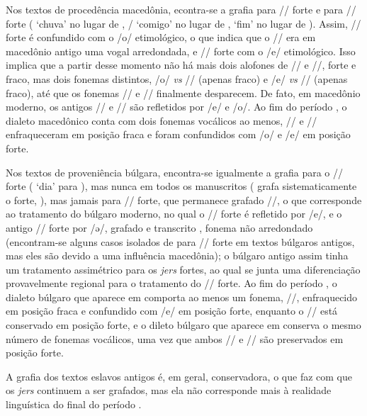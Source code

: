 Nos textos de procedência macedônia, econtra-se a grafia  para
/\jeru{}/ forte e  para /\jeri{}/ forte
( `chuva' no lugar de
, \slash{}
`comigo' no lugar de ,
 `fim' no lugar de
).
Assim, /\jeru{}/ forte é confundido com o /o/ etimológico, o que indica que
o /\jeru{}/ era em macedônio antigo uma vogal arredondada, e /\jeri{}/
forte com o /e/ etimológico.
Isso implica que a partir desse momento não há mais dois alofones de /\jeru{}/
e /\jeri{}/, forte e fraco, mas dois fonemas distintos, /o/ \emph{vs}
/\jeru{}/ (apenas fraco) e /e/ \emph{vs} /\jeri{}/ (apenas fraco), até
que os fonemas /\jeru{}/ e /\jeri{}/ finalmente desparecem.
De fato, em macedônio moderno, os antigos /\jeru{}/ e /\jeri{}/ são
refletidos por /e/ e /o/.
Ao fim do período , o dialeto macedônico conta com dois fonemas
vocálicos ao menos, /\jeru{}/ e /\jeri{}/ enfraqueceram em posição
fraca e foram confundidos com /o/ e /e/ em posição forte.

Nos textos de proveniência  búlgara, encontra-se igualmente  a grafia
 para o /\jeri{}/ forte ( `dia' para
 ), mas nunca em todos os manuscritos
( grafa sistematicamente o  forte,
), mas jamais  para /\jeru{}/ forte, que permanece
grafado /\jeru{}/, o que corresponde ao tratamento do búlgaro moderno, no qual o
/\jeri{}/ forte é refletido por /e/, e o antigo /\jeru{}/ forte por /ə/, grafado
\grafema{\jeru} e transcrito , fonema não arredondado (encontram-se
alguns casos isolados de  para /\jeru{}/ forte em textos búlgaros
antigos, mas eles são devido a uma influência macedônia); o búlgaro antigo assim
tinha um tratamento assimétrico para os \emph{jers} fortes, ao qual se junta uma
diferenciação provavelmente regional para o tratamento do /\jeri{}/ forte.
Ao fim do período , o dialeto búlgaro que aparece em
 comporta ao menos um fonema, /\jeri{}/, enfraquecido em
posição fraca e confundido com /e/ em posição forte, enquanto o /\jeru{}/ está
conservado em posição forte, e o dileto búlgaro que aparece em 
conserva o mesmo número de fonemas vocálicos, uma vez que ambos /\jeri{}/ e
/\jeru{}/ são preservados em posição forte.

A grafia dos textos eslavos antigos é, em geral, conservadora, o que faz com que
os \emph{jers} continuem a ser grafados, mas ela não corresponde mais à
realidade linguística do final do período .

